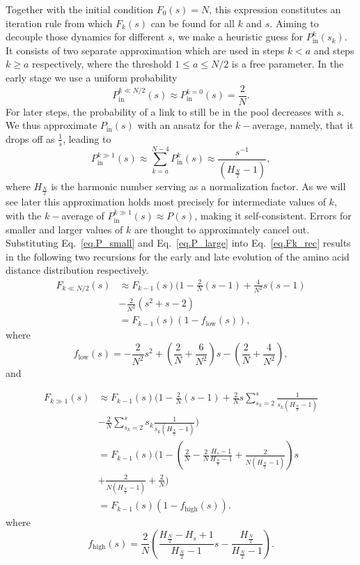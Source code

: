 \documentclass[
reprint,
twocolumn,
amsmath,amssymb,superscriptaddress,aps,
pre]{revtex4-1}
\newcommand{\Pin}{P_{\mathrm{in}}}
\newcommand{\fhigh}{f_{\mathrm{high}}}
\newcommand{\flow}{f_{\mathrm{low}}}
\begin{document}
Together with the initial condition $F_0(s)=N$, this expression constitutes an iteration rule from which $F_k(s)$ can be found for all $k$ and $s$. Aiming to decouple those dynamics for different $s$, we make a heuristic guess for $\Pin^k(s_k)$. It consists of two separate approximation which are used in steps $k<a$ and steps $k\geq a$ respectively, where the threshold $1\leq a\leq N/2$ is a free parameter. In the early stage we use a uniform probability
\begin{equation}
    \Pin^{k\ll N/2}(s)\approx \Pin^{k=0}(s)=\frac{2}{N}.
    \label{eq.P_small}
\end{equation}
For later steps, the probability of a link to still be in the pool decreases with $s$. We thus approximate $\Pin(s)$ with an ansatz for the $k-$average, namely, that it drops off as $\frac{1}{s}$, leading to
\begin{equation}
    \Pin^{k\gg 1}(s)\approx \sum_{k=a}^{N-4}\Pin^{k}(s)
    \approx \frac{s^{-1}}{ (H_{\frac{N}{2}}-1)},
    \label{eq.P_large}
\end{equation}
where $H_{\frac{N}{2}}$ is the harmonic number serving as a normalization factor. 
As we will see later this approximation holds most precisely for intermediate values of $k$, with the $k-$average of $\Pin^{k\gg 1}(s)\approx P(s)$, making it self-consistent. Errors for smaller and larger values of $k$ are thought to approximately cancel out.
Substituting Eq.~\ref{eq.P_small} and Eq.~\ref{eq.P_large} into Eq.~\ref{eq.Fk_rec} results in the following two recursions for the early and late evolution of the amino acid distance distribution respectively.
\begin{align}
   F_{k\ll N/2}(s)&\approx 
   F_{k-1}(s)(1-\frac{2}{N} (s-1) 
   +\frac{4}{N^2} s (s-1)\nonumber \\
   &-\frac{2}{N^2}(s^2+s-2)\nonumber \\
   &=F_{k-1}(s)(1-\flow(s)),
   \label{eq.Fk_rec_low}
\end{align}
where 
\[\flow(s)=-\frac{2}{N^2}s^2+\left(\frac{2}{N}+\frac{6}{N^2}\right)s-\left(\frac{2}{N}+\frac{4}{N^2}\right),\]
and


\begin{align}
   F_{k\gg1}(s)&\approx 
   F_{k-1}(s)(1-\frac{2}{N} (s-1) 
   +\frac{2}{N} s \sum_{s_k=2}^{s}\frac{1}{s_k(H_{\frac{N}{2}}-1)}\nonumber\\
   &-\frac{2}{N}
   \sum_{s_k=2}^{s} s_k \frac{1}{s_k(H_{\frac{N}{2}}-1)})\nonumber \\
   &=
   F_{k-1}(s)(1 -(\frac{2}{N}-\frac{2}{N}\frac{H_{s}-1}{H_{\frac{N}{2}}-1}+\frac{2}{N(H_{\frac{N}{2}}-1)})s \nonumber \\ 
   &+ \frac{2}{N(H_{\frac{N}{2}}-1)} + \frac{2}{N})\nonumber \\
   &=F_{k-1}(s)(1-\fhigh(s)).
   \label{eq.Fk_rec_high}
\end{align}
where 
\[\fhigh(s)=\frac{2}{N}(\frac{H_{\frac{N}{2}}-H_{s}+1}{H_{\frac{N}{2}}-1}s-\frac{H_{\frac{N}{2}}}{H_{\frac{N}{2}}-1}).\]
\end{document}
